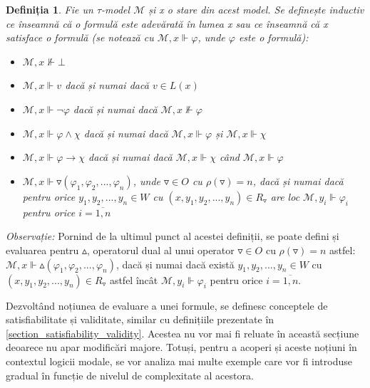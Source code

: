 \documentclass[12pt, openany]{book}
\newtheorem{definition}{Definiția}[chapter] %
\newcommand{\mysectionreference}[1]{\autoref{#1}}
\begin{document}
            \begin{definition}
                Fie un $\tau$-model $\mathcal{M}$ și x o stare din acest model. Se definește inductiv ce înseamnă că o 
                formulă este adevărată în lumea x sau ce înseamnă că x satisface o formulă (se notează cu $\mathcal{M},x \Vdash 
                \varphi$, unde $\varphi$ este o formulă):
                \begin{itemize}
                    \item $\mathcal{M},x \nVdash \bot$
                    \item $\mathcal{M},x \Vdash v$ dacă și numai dacă $v \in L(x)$
                    \item $\mathcal{M},x \Vdash \neg \varphi$ dacă și numai dacă $\mathcal{M},x \nVdash \varphi$
                    \item $\mathcal{M},x \Vdash \varphi \wedge \chi$ dacă și numai dacă $\mathcal{M},x \Vdash \varphi$ și $\mathcal{M},x \Vdash \chi$
                    \item $\mathcal{M},x \Vdash \varphi \rightarrow \chi$ dacă și numai dacă $\mathcal{M},x \Vdash \chi$ când $\mathcal{M},x \Vdash \varphi$
                    \item $\mathcal{M},x \Vdash \triangledown(\varphi_1,\varphi_2,...,\varphi_n)$, unde $\triangledown \in O$ cu
                    $\rho(\triangledown)=n$, dacă și numai dacă pentru orice $y_1,y_2,...,y_n \in W$ cu $(x,y_1,y_2,...,y_n) 
                    \in R_\triangledown$ are loc $\mathcal{M},y_i \Vdash \varphi_i$ pentru orice $i=\overline{1,n}$
                \end{itemize}
            \end{definition}

            \par{}
                \noindent \textit{Observație:} Pornind de la ultimul punct al acestei definiții, se poate defini și 
                evaluarea pentru $\vartriangle$, operatorul dual al unui operator $\triangledown \in O$ cu $\rho(\triangledown)=n$
                astfel: $\mathcal{M},x \Vdash \vartriangle(\varphi_1,\varphi_2,...,\varphi_n)$, dacă și numai dacă există 
                $y_1,y_2,...,y_n \in W$ cu $(x,y_1,y_2,...,y_n) \in R_\triangledown$ astfel încât $\mathcal{M},y_i \Vdash 
                \varphi_i$ pentru orice $i=\overline{1,n}$.

            \par{}
                Dezvoltând noțiunea de evaluare a unei formule, se definesc conceptele de satisfiabilitate și validitate, 
                similar cu definițiile prezentate în \mysectionreference{section_satisfiability_validity}. Acestea 
                nu vor mai fi reluate în această secțiune deoarece nu apar modificări majore. Totuși, pentru a 
                acoperi și aceste noțiuni în contextul logicii modale, se vor analiza mai multe exemple care vor fi 
                introduse gradual în funcție de nivelul de complexitate al acestora.
\end{document}
